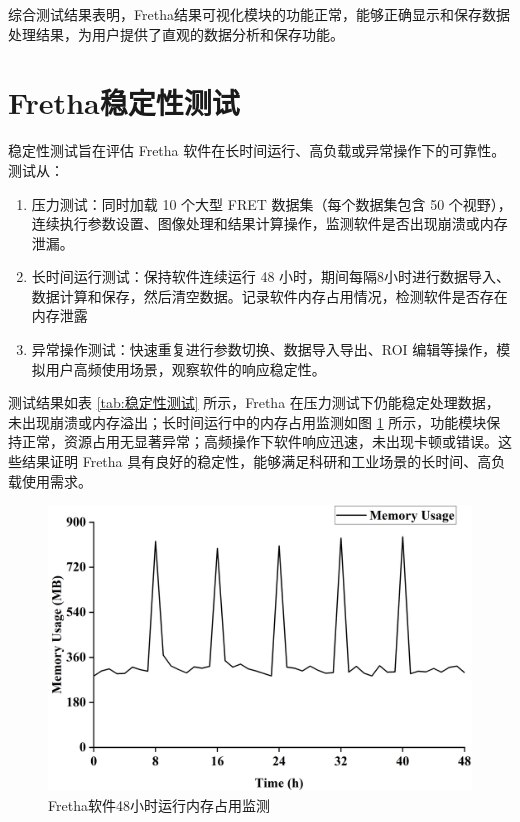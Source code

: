 综合测试结果表明，Fretha结果可视化模块的功能正常，能够正确显示和保存数据处理结果，为用户提供了直观的数据分析和保存功能。

\section{Fretha稳定性测试}
稳定性测试旨在评估 Fretha 软件在长时间运行、高负载或异常操作下的可靠性。测试从：
\begin{enumerate}
  \item 压力测试：同时加载 10 个大型 FRET 数据集（每个数据集包含 50 个视野），连续执行参数设置、图像处理和结果计算操作，监测软件是否出现崩溃或内存泄漏。
  \item 长时间运行测试：保持软件连续运行 48 小时，期间每隔8小时进行数据导入、数据计算和保存，然后清空数据。记录软件内存占用情况，检测软件是否存在内存泄露
  \item 异常操作测试：快速重复进行参数切换、数据导入导出、ROI 编辑等操作，模拟用户高频使用场景，观察软件的响应稳定性。
\end{enumerate}

测试结果如表 \ref{tab:稳定性测试} 所示，Fretha 在压力测试下仍能稳定处理数据，未出现崩溃或内存溢出；长时间运行中的内存占用监测如图 \ref{fig:48小时内存变化} 所示，功能模块保持正常，资源占用无显著异常；高频操作下软件响应迅速，未出现卡顿或错误。这些结果证明 Fretha 具有良好的稳定性，能够满足科研和工业场景的长时间、高负载使用需求。
\begin{figure}[hbtp]
  \centering
  \includegraphics[width=0.7\linewidth]{../figures/4/4_48小时内存占用变化.png}
  \caption{Fretha软件48小时运行内存占用监测}
  \label{fig:48小时内存变化}
\end{figure}


